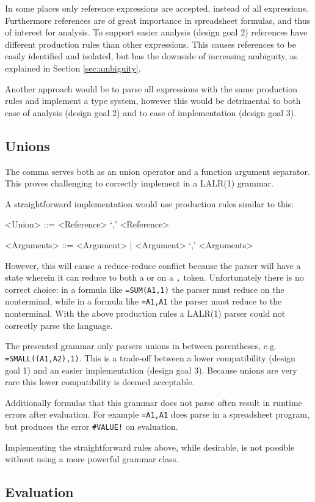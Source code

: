 In some places only reference expressions are accepted, instead of all expressions.
Furthermore references are of great importance in spreadsheet formulas, and thus of interest for analysis.
To support easier analysis (design goal 2) references have different production rules than other expressions.
This causes references to be easily identified and isolated, but has the downside of increasing ambiguity, as explained in Section \ref{sec:ambiguity}. 

Another approach would be to parse all expressions with the same production rules and implement a type system, however this would be detrimental to both ease of analysis (design goal 2) and to ease of implementation (design goal 3).

\subsection{Unions}
\label{subsec:desing:unions}

The comma serves both as an union operator and a function argument separator.
This proves challenging to correctly implement in a LALR(1) grammar.

A straightforward implementation would use production rules similar to this:
\begin{grammar}
<Union> ::= <Reference> `,' <Reference>

<Arguments> ::= <Argument> | <Argument> `,' <Arguments>
\end{grammar}

However, this will cause a reduce-reduce conflict because the parser will have a state wherein it can reduce to both a  or  on a \texttt{,} token.
Unfortunately there is no correct choice: in a formula like \texttt{=SUM(A1,1)} the parser must reduce on the  nonterminal, while in a formula like \texttt{=A1,A1} the parser must reduce to the  nonterminal.
With the above production rules a LALR(1) parser could not correctly parse the language.

The presented grammar only parsers unions in between parentheses, e.g. \texttt{=SMALL((A1,A2),1)}.
This is a trade-off between a lower compatibility (design goal 1) and an easier implementation (design goal 3).
Because unions are very rare \cite{xlparser} this lower compatibility is deemed acceptable.

Additionally formulas that this grammar does not parse often result in runtime errors after evaluation.
For example \texttt{=A1,A1} does parse in a spreadsheet program, but produces the error \texttt{\#VALUE!} on evaluation.

Implementing the straightforward rules above, while desirable, is not possible without using a more powerful grammar class.

\subsection{Evaluation}

